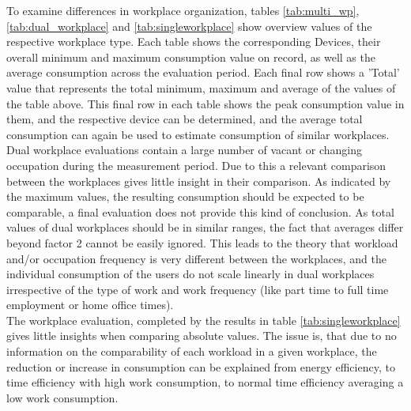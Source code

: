 To examine differences in workplace organization, tables \ref{tab:multi_wp}, \ref{tab:dual_workplace} and \ref{tab:singleworkplace} show overview values of the respective workplace type. Each table shows the corresponding Devices, their overall minimum and maximum consumption value on record, as well as the average consumption across the evaluation period. Each final row shows a 'Total' value that represents the total minimum, maximum and average of the values of the table above. This final row in each table shows the peak consumption value in them, and the respective device can be determined, and the average total consumption can again be used to estimate consumption of similar workplaces. Dual workplace evaluations contain a large number of vacant or changing occupation during the measurement period. Due to this a relevant comparison between the workplaces gives little insight in their comparison. As indicated by the maximum values, the resulting consumption should be expected to be comparable, a final evaluation does not provide this kind of conclusion. As total values of dual workplaces should be in similar ranges, the fact that averages differ beyond factor 2 cannot be easily ignored. This leads to the theory that workload and/or occupation frequency is very different between the workplaces, and the individual consumption of the users do not scale linearly in dual workplaces irrespective of the type of work and work frequency (like part time to full time employment or home office times).\\The workplace evaluation, completed by the results in table \ref{tab:singleworkplace} gives little insights when comparing absolute values. The issue is, that due to no information on the comparability of each workload in a given workplace, the reduction or increase in consumption can be explained from energy efficiency, to time efficiency with high work consumption, to normal time efficiency averaging a low work consumption.\\
